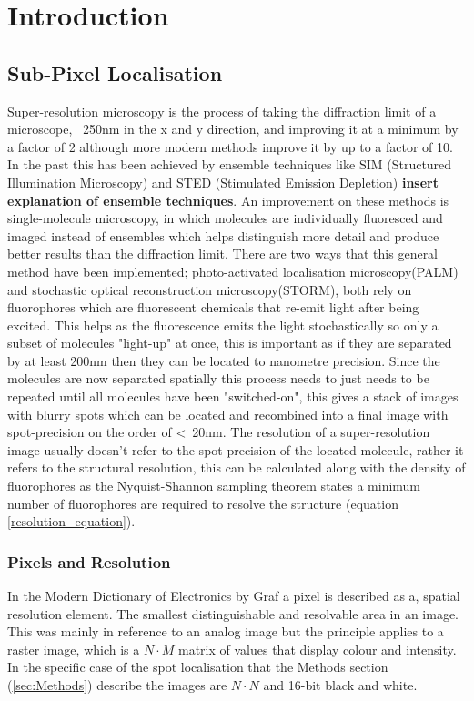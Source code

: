\documentclass[aps,pra,a4paper,nofootinbib,onecolumn,tightenlines,longbibliography,12pt,amsfonts,amssymb,amsmath,floatfix]{revtex4-2} %
\begin{document}
\section{Introduction}
\label{sec:intro}
  \subsection{Sub-Pixel Localisation} %
  \label{sub:spot-finding intro}
  
  Super-resolution microscopy is the process of taking the diffraction limit 
  of a microscope, ~250nm in the x and y direction, and improving it at a minimum by a 
  factor of 2 although more modern methods improve it by up to a factor of 10. In the past this has been achieved by ensemble techniques
  like SIM (Structured Illumination Microscopy) and STED (Stimulated Emission Depletion)
  \textbf{insert explanation of ensemble techniques}. An improvement on these methods 
  is single-molecule microscopy, in which molecules are individually fluoresced and 
  imaged instead of ensembles which helps distinguish more detail and produce better
  results than the diffraction limit.
  There are two ways that this general method have been implemented; photo-activated localisation
  microscopy(PALM) and stochastic optical reconstruction microscopy(STORM), both
  rely on fluorophores which are fluorescent chemicals that re-emit light after
  being excited. This helps as the fluorescence emits the light 
  stochastically so only a subset of molecules "light-up" at once, this is important 
  as if they are separated by at least 200nm then they can be located to nanometre precision. 
  Since the molecules are now separated spatially this process needs to just needs to be repeated 
  until all molecules have been "switched-on", this gives a stack of images with blurry spots
  which can be located and recombined into a final image with spot-precision on the order of <~20nm.\cite{galbraith2011super}
  The resolution of a super-resolution image usually doesn't refer to the spot-precision of the 
  located molecule, rather it refers to the structural resolution, this can be calculated along 
  with the density of fluorophores as the Nyquist-Shannon sampling theorem states a minimum number 
  of fluorophores are required to resolve the structure (equation \ref{resolution_equation}). \cite{van2011single}\cite{shannon1949communication}

  \subsubsection{Pixels and Resolution} %
  \label{ssub:Pixel}
   In the Modern Dictionary of Electronics by Graf a pixel is described as a, 
   spatial resolution element.
   The smallest distinguishable and resolvable area in an image.
   \cite{graf1997modern}
   This was mainly in reference to an analog image but the principle applies 
   to a raster image, which is a $N\cdot M$ matrix of values that display colour and
   intensity. In the specific case of the spot localisation that the Methods section 
   (\ref{sec:Methods}) describe the images are $N\cdot N$ and 16-bit black and white.
\end{document}
